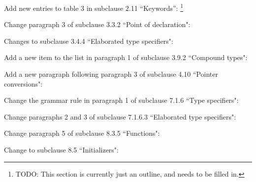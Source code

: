 Add new entries to table 3 in subclause 2.11 ``Keywords'':%
\footnote{TODO:
This section is currently just an outline, and needs to be filled in.
}

Change paragraph 3 of subclause 3.3.2 ``Point of declaration":

Changes to subclause 3.4.4 ``Elaborated type specifiers":

Add a new item to the list in paragraph 1
of subclause 3.9.2 ``Compound types":

Add a new paragraph following paragraph 3
of subclause 4.10 ``Pointer conversions":

Change the grammar rule in paragraph 1 of subclause 7.1.6 ``Type specifiers":

Change paragraphs 2 and 3 of subclause 7.1.6.3 ``Elaborated type specifiers":

Change paragraph 5 of subclause 8.3.5 ``Functions":

Change to subclause 8.5 ``Initializers":
